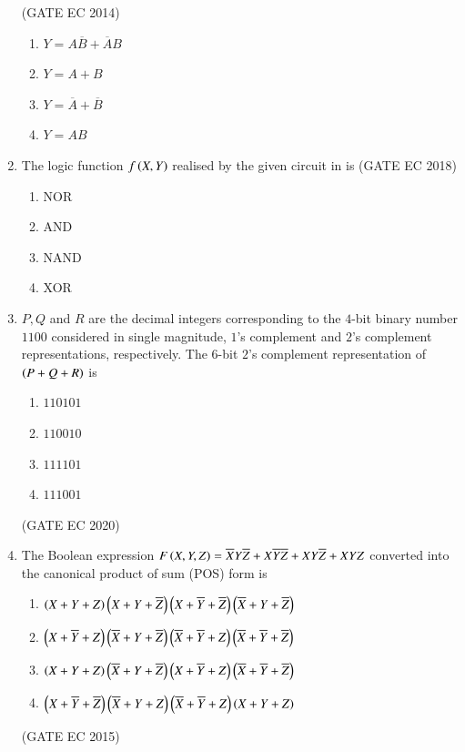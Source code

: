 \begin{enumerate}[label=\arabic*.,ref=\theenumi]
\hfill (GATE EC 2014)
\begin{figure}[H]
\centering
\resizebox{0.75\columnwidth}{!}{%

	}
	\caption{}
\label{fig:GATE-EC 2014,15}
\end{figure}
\begin{enumerate}
    \item $Y= A\overline{B}+ \overline{A}B $ 
    \item $Y=A+B$
    \item $Y=\overline{A}+\overline{B}$
    \item $Y=AB$
\end{enumerate}
\item The logic function $f\left(X,Y\right)$ realised by the given circuit in
is
\hfill (GATE EC 2018)
\begin{figure}[H]
\centering
\resizebox{0.75\columnwidth}{!}{%

	}
	\caption{}
\label{fig:GATE-EC 2018,8}
\end{figure}
\begin{enumerate}
    \item NOR
    \item AND
    \item NAND
    \item XOR
\end{enumerate}
%
\item $P, Q$ and $R$ are the decimal integers corresponding to the  $4$-bit binary number  $1100$ considered in single magnitude, $1$'s complement and $2$'s complement representations, respectively. The $6$-bit $2$'s complement representation of $\left(P + Q + R\right)$ is
\begin{enumerate}
  \item $110101$
  \item $110010$
  \item $111101$
  \item $111001$
\end{enumerate}
   \hfill(GATE EC 2020)
 \item The Boolean expression $F\left(X,Y,Z\right) = \overline{X}Y\overline{Z}+X\overline{Y}\overline{Z}+XY\overline{Z}+XYZ$ converted into the canonical product of sum (POS) form is
 \begin{enumerate}
     \item $\left(X+Y+Z\right)\left(X+Y+\overline{Z}\right)\left(X+\overline{Y}+\overline{Z}\right)\left(\overline{X}+Y+\overline{Z}\right)$
     \item $\left(X+\overline{Y}+Z\right)\left(\overline{X}+Y+\overline{Z}\right)\left(\overline{X}+\overline{Y}+Z\right)\left(\overline{X}+\overline{Y}+\overline{Z}\right)$
     \item $\left(X+Y+Z\right)\left(\overline{X}+Y+\overline{Z}\right)\left(X+\overline{Y}+Z\right)\left(\overline{X}+\overline{Y}+\overline{Z}\right)$
     \item $\left(X+\overline{Y}+\overline{Z}\right)\left(\overline{X}+Y+Z\right)\left(\overline{X}+\overline{Y}+Z\right)\left(X+Y+Z\right)$
 \end{enumerate}
\hfill (GATE EC 2015)
\end{enumerate}


